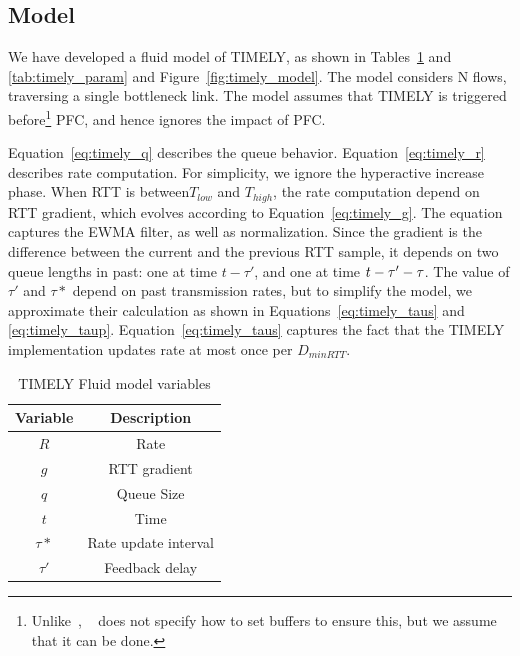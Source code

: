 \subsection{Model}

We have developed a fluid model of TIMELY, as shown in
Tables~\ref{tab:timely_var} and \ref{tab:timely_param} and
Figure~\ref{fig:timely_model}.  The model considers N flows, traversing a single
bottleneck link. The model assumes that TIMELY is triggered
before\footnote{Unlike~\cite{dcqcn}, ~\cite{timely} does not specify how to set
buffers to ensure this, but we assume that it can be done.} PFC, and hence
ignores the impact of PFC.

Equation~\ref{eq:timely_q} describes the queue behavior.
Equation~\ref{eq:timely_r} describes rate computation. For simplicity, we ignore
the hyperactive increase phase. When RTT is between$T_{low}$ and $T_{high}$, the
rate computation depend on RTT gradient, which evolves according to
Equation~\ref{eq:timely_g}.  The equation captures the EWMA filter, as well as
normalization. Since the gradient is the difference between the current and the
previous RTT sample, it depends on two queue lengths in past: one at time $t -
\tau'$, and one at time $t - \tau'-\tau\*$. The value of $\tau'$ and $\tau*$
depend on past transmission rates, but to simplify the model, we approximate
their calculation as shown in Equations~\ref{eq:timely_taus} and
\ref{eq:timely_taup}.  Equation~\ref{eq:timely_taus} captures the fact that the
TIMELY implementation updates rate at most once per $D_{minRTT}$.

\begin{table}[t]
\center
{
\footnotesize
{
\begin{tabular}{|c|c|} \hline
Variable & Description \\ \hline
$R$ & Rate \\ \hline
$g$ & RTT gradient\\ \hline
$q$ & Queue Size \\ \hline
$t$ & Time \\ \hline
$\tau*$ & Rate update interval \\ \hline
$\tau'$ & Feedback delay \\ \hline
\end{tabular}
}
}
\caption{TIMELY Fluid model variables}
\label{tab:timely_var}
\end{table}

